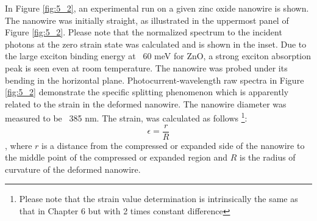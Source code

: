 In Figure \ref{fig:5_2}, an experimental run on a given zinc oxide nanowire is shown. The nanowire was initially straight, as illustrated in the uppermost panel of Figure \ref{fig:5_2}. 
Please note that the normalized spectrum to the incident photons at the zero strain state was calculated and is shown in the inset. 
Due to the large exciton binding energy at ~60 meV for ZnO, a strong exciton absorption peak is seen even at room temperature. 
The nanowire was probed under its bending in the horizontal plane. 
Photocurrent-wavelength raw spectra in Figure \ref{fig:5_2} demonstrate the specific splitting phenomenon which is apparently related to the strain in the deformed nanowire. 
The nanowire diameter was measured to be ~385 nm. 
The strain, was calculated as follows \footnote{Please note that the strain value determination is intrinsically the same as that in  Chapter 6 but with  2 times constant difference }: $$\epsilon = \frac{r}{R} $$
, where $r$ is a distance from the compressed or expanded side of the nanowire to the middle point of the compressed or expanded region and $R$ is the radius of curvature of the deformed nanowire. \\

